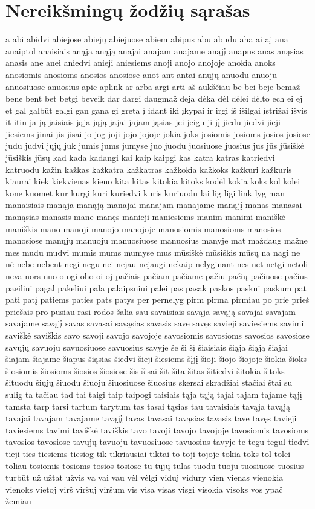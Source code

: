 \documentclass{VUMIFInfKursinis}
\begin{document}
\section{Nereikšmingų žodžių sąrašas}\label{stopWords}
\small
a abi abidvi abiejose abiejų abiejuose abiem abipus abu abudu aha ai aj ana anaiptol anaisiais anąja anąją anajai anajam anajame anąjį anapus anas anąsias anasis ane anei aniedvi anieji aniesiems anoji anojo anojoje anokia anoks anosiomis anosioms anosios anosiose anot ant antai anųjų anuodu anuoju anuosiuose anuosius apie aplink ar arba argi arti aš aukščiau be bei beje bemaž bene bent bet betgi beveik dar dargi daugmaž deja dėka dėl dėlei dėlto ech ei ej et gal galbūt galgi gan gana gi greta į idant iki įkypai ir irgi iš išilgai įstrižai išvis it itin ja ją jaisiais jąja jąją jajai jajam jąsias jei jeigu ji jį jiedu jiedvi jieji jiesiems jinai jis jisai jo jog joji jojo jojoje jokia joks josiomis josioms josios josiose judu judvi jųjų juk jumis jums jumyse juo juodu juosiuose juosius jus jūs jūsiškė jūsiškis jūsų kad kada kadangi kai kaip kaipgi kas katra katras katriedvi katruodu kažin kažkas kažkatra kažkatras kažkokia kažkoks kažkuri kažkuris kiaurai kiek kiekvienas kieno kita kitas kitokia kitoks kodėl kokia koks kol kolei kone kuomet kur kurgi kuri kuriedvi kuris kuriuodu lai lig ligi link lyg man manaisiais manąja manąją manajai manajam manajame manąjį manas manasai manąsias manasis mane manęs manieji maniesiems manim manimi maniškė maniškis mano manoji manojo manojoje manosiomis manosioms manosios manosiose manųjų manuoju manuosiuose manuosius manyje mat maždaug mažne mes mudu mudvi mumis mums mumyse mus mūsiškė mūsiškis mūsų na nagi ne nė nebe nebent negi negu nei nejau nejaugi nekaip nelyginant nes net netgi netoli neva nors nuo o ogi oho oi oj pačiais pačiam pačiame pačiu pačių pačiuose pačius paeiliui pagal pakeliui pala palaipsniui palei pas pasak paskos paskui paskum pat pati patį patiems paties pats patys per pernelyg pirm pirma pirmiau po prie prieš priešais pro pusiau rasi rodos šalia sau savaisiais savąja savąją savajai savajam savajame savąjį savas savasai savąsias savasis save savęs savieji saviesiems savimi saviškė saviškis savo savoji savojo savojoje savosiomis savosioms savosios savosiose savųjų savuoju savuosiuose savuosius savyje še ši šį šiaisiais šiąja šiąją šiajai šiajam šiajame šiapus šiąsias šiedvi šieji šiesiems šįjį šioji šiojo šiojoje šiokia šioks šiosiomis šiosioms šiosios šiosiose šis šisai šit šita šitas šitiedvi šitokia šitoks šituodu šiųjų šiuodu šiuoju šiuosiuose šiuosius skersai skradžiai stačiai štai su sulig ta tačiau tad tai taigi taip taipogi taisiais tąja tąją tajai tajam tajame tąjį tamsta tarp tarsi tartum tarytum tas tasai tąsias tau tavaisiais tavąja tavąją tavajai tavajam tavajame tavąjį tavas tavasai tavąsias tavasis tave tavęs tavieji taviesiems tavimi taviškė taviškis tavo tavoji tavojo tavojoje tavosiomis tavosioms tavosios tavosiose tavųjų tavuoju tavuosiuose tavuosius tavyje te tegu tegul tiedvi tieji ties tiesiems tiesiog tik tikriausiai tiktai to toji tojoje tokia toks tol tolei toliau tosiomis tosioms tosios tosiose tu tųjų tūlas tuodu tuoju tuosiuose tuosius turbūt už užtat užvis va vai vau vėl vėlgi viduj vidury vien vienas vienokia vienoks vietoj virš viršuj viršum vis visa visas visgi visokia visoks vos ypač žemiau
\end{document}
